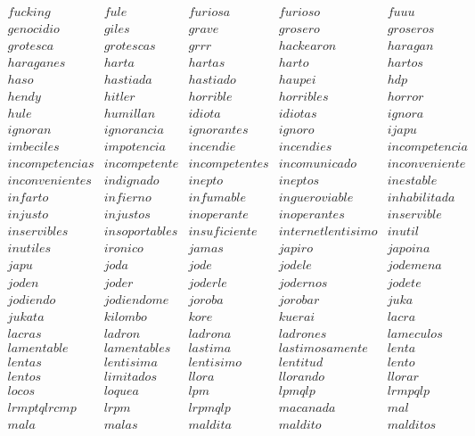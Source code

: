 \noindent
$
\begin{array}{ccccc}
fucking & fule & furiosa & furioso & fuuu \\
genocidio & giles & grave & grosero & groseros \\
grotesca & grotescas & grrr & hackearon & haragan \\
haraganes & harta & hartas & harto & hartos \\
haso & hastiada & hastiado & haupei & hdp \\
hendy & hitler & horrible & horribles & horror \\
hule & humillan & idiota & idiotas & ignora \\
ignoran & ignorancia & ignorantes & ignoro & ijapu \\
imbeciles & impotencia & incendie & incendies & incompetencia \\
incompetencias & incompetente & incompetentes & incomunicado & inconveniente \\
inconvenientes & indignado & inepto & ineptos & inestable \\
infarto & infierno & infumable & ingueroviable & inhabilitada \\
injusto & injustos & inoperante & inoperantes & inservible \\
inservibles & insoportables & insuficiente & internetlentisimo & inutil \\
inutiles & ironico & jamas & japiro & japoina \\
japu & joda & jode & jodele & jodemena \\
joden & joder & joderle & jodernos & jodete \\
jodiendo & jodiendome & joroba & jorobar & juka \\
jukata & kilombo & kore & kuerai & lacra \\
lacras & ladron & ladrona & ladrones & lameculos \\
lamentable & lamentables & lastima & lastimosamente & lenta \\
lentas & lentisima & lentisimo & lentitud & lento \\
lentos & limitados & llora & llorando & llorar \\
locos & loquea & lpm & lpmqlp & lrmpqlp \\
lrmptqlrcmp & lrpm & lrpmqlp & macanada & mal \\
mala & malas & maldita & maldito & malditos \\
\end{array}
$

